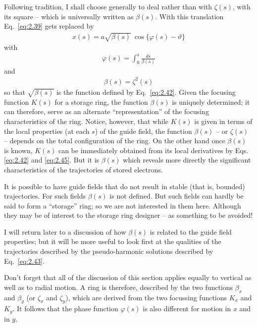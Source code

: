 \documentclass[../sands-adaptation.tex]{subfiles}
\begin{document}
Following tradition, I shall choose generally to deal rather than with $\zeta(s)$, with its square -- which is universally written as $\beta(s)$. With this translation Eq.~\eqref{eq:2.39} gets replaced by
\begin{align}
	x(s) = a\sqrt{\beta(s)}\ \cos\{\varphi(s)-\vartheta\}\label{eq:2.43}
\end{align}
with
\begin{align}
	\varphi(s) = \int_{0}^{s} \frac{d\bar{s}}{\beta(\bar{s})}\label{eq:2.44}
\end{align}
and
\begin{align}
	\beta(s) = \zeta^2(s)\label{eq:2.45}
\end{align}
so that $\sqrt{\beta(s)}$ is the function defined by Eq.~\eqref{eq:2.42}. Given the focusing function $K(s)$ for a storage ring, the function $\beta(s)$ is uniquely determined; it can therefore, serve as an alternate “representation” of the focusing characteristics of the ring. Notice, however, that while $K(s)$ is given in terms of the local properties (at each $s$) of the guide field, the function
$\beta(s)$ -- or $\zeta(s)$ -- depends on the total configuration of the ring. On the other hand once $\beta(s)$ is known, $K(s)$ can be immediately obtained from its local derivatives by Eqs. \eqref{eq:2.42} and \eqref{eq:2.45}. But it is $\beta(s)$ which reveals more directly the significant characteristics of the trajectories of stored electrons.

It is possible to have guide fields that do not result in stable (that is, bounded) trajectories. For such fields $\beta(s)$ is not defined. But such fields can hardly be said to form a ``storage'' ring; so we are not interested in them here. Although they may be of interest to the storage ring designer -- as something to be avoided!

I will return later to a discussion of how $\beta(s)$ is related to the guide field properties; but it will be more useful to look first at the qualities of the trajectories described by the pseudo-harmonic solutions described by Eq.~\ref{eq:2.43}.

Don't forget that all of the discussion of this section applies equally to vertical as well as to radial motion. A ring is therefore, described by the two functions $\beta_x$ and $\beta_y$ (or $\zeta_x$ and $\zeta_y$), which are derived from the two focussing functions $K_x$ and $K_y$. It follows that the phase function $\varphi(s)$ is also different for motion in $x$ and in $y$.
\end{document}
